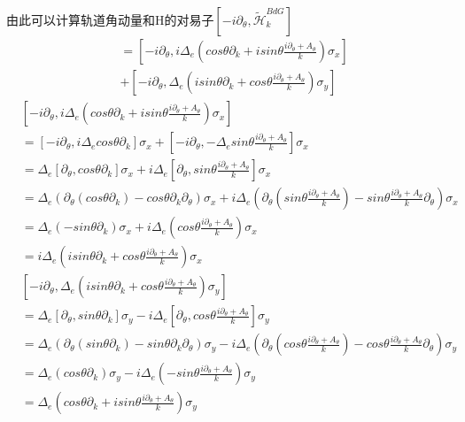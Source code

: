 \documentclass[22pt]{article}
\begin{document}
由此可以计算轨道角动量和H的对易子$[-i\partial_{\theta},\tilde{\mathcal{H}}_k^{BdG}]$
\begin{align}
	[-i\partial_{\theta},\tilde{\mathcal{H}}_k^{BdG}]&=[-i\partial_{\theta},i\Delta_e(cos\theta\partial_k+isin\theta\frac{i\partial_{\theta}+A_{\theta}}{k})\sigma_x]\\
	&+[-i\partial_{\theta},\Delta_e(isin\theta\partial_k+cos\theta\frac{i\partial_{\theta}+A_{\theta}}{k})\sigma_y]
\end{align}
\begin{align}
	&[-i\partial_{\theta},i\Delta_e(cos\theta\partial_k+isin\theta\frac{i\partial_{\theta}+A_{\theta}}{k})\sigma_x]
	\\&=[-i\partial_{\theta},i\Delta_ecos\theta\partial_k]\sigma_x+[-i\partial_{\theta},-\Delta_esin\theta\frac{i\partial_{\theta}+A_{\theta}}{k}]\sigma_x\\
	&=\Delta_e[\partial_{\theta},cos\theta\partial_k]\sigma_x+i\Delta_e[\partial_{\theta},sin\theta\frac{i\partial_{\theta}+A_{\theta}}{k}]\sigma_x\\ \nonumber
	&=\Delta_e(\partial_{\theta}(cos\theta\partial_k)-cos\theta\partial_k\partial_{\theta})\sigma_x+i\Delta_e(\partial_{\theta}(sin\theta\frac{i\partial_{\theta}+A_{\theta}}{k})-sin\theta\frac{i\partial_{\theta}+A_{\theta}}{k}\partial_{\theta})\sigma_x\\
	&=\Delta_e(-sin\theta\partial_k)\sigma_x+i\Delta_e(cos\theta\frac{i\partial_{\theta}+A_{\theta}}{k})\sigma_x \\
	&=i\Delta_e(isin\theta\partial_k+cos\theta\frac{i\partial_{\theta}+A_{\theta}}{k})\sigma_x
\end{align}
\begin{align}
	&[-i\partial_{\theta},\Delta_e(isin\theta\partial_k+cos\theta\frac{i\partial_{\theta}+A_{\theta}}{k})\sigma_y]\\
	&=\Delta_e[\partial_{\theta},sin\theta\partial_k]\sigma_y-i\Delta_e[\partial_{\theta},cos\theta\frac{i\partial_{\theta}+A_{\theta}}{k}]\sigma_y\\ \nonumber
	&=\Delta_e(\partial_{\theta}(sin\theta\partial_k)-sin\theta\partial_k\partial_{\theta})\sigma_y-i\Delta_e(\partial_{\theta}(cos\theta\frac{i\partial_{\theta}+A_{\theta}}{k})-cos\theta\frac{i\partial_{\theta}+A_{\theta}}{k}\partial_{\theta})\sigma_y\\
	&=\Delta_e(cos\theta\partial_k)\sigma_y-i\Delta_e(-sin\theta\frac{i\partial_{\theta}+A_{\theta}}{k})\sigma_y\\
	&=\Delta_e(cos\theta\partial_k+isin\theta\frac{i\partial_{\theta}+A_{\theta}}{k})\sigma_y
\end{align}
\end{document}
